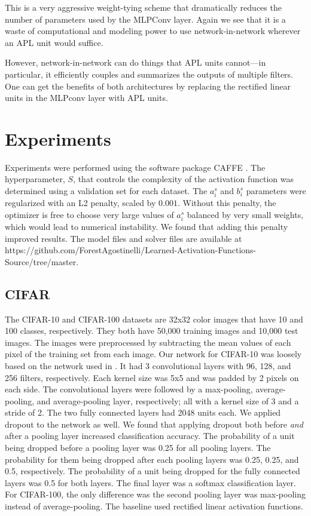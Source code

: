 \documentclass{article} \usepackage{iclr2015,times}
\begin{document}
This is a very aggressive weight-tying scheme that dramatically
reduces the number of parameters used by the MLPConv layer. Again we
see that it is a waste of computational and modeling power to use
network-in-network wherever an APL unit would suffice.



However, network-in-network can do things that APL units cannot---in
particular, it efficiently couples and summarizes the outputs of
multiple filters. One can get the benefits of both architectures by
replacing the rectified linear units in the MLPconv layer with
APL units.

 
\section{Experiments}
\label{sec:experiments}
Experiments were performed using the software package CAFFE \citep{jia2014caffe}. The hyperparameter, $S$, that controls the complexity of the activation function was determined using a validation set for each dataset. The $a^s_i$ and $b^s_i$ parameters were regularized with an L2 penalty, scaled by $0.001$. Without this penalty, the optimizer is free to choose very large values of $a^s_i$ balanced by very small weights, which would lead to numerical instability. We found that adding this penalty improved results. The model files and solver files are available at https://github.com/ForestAgostinelli/Learned-Activation-Functions-Source/tree/master.

\subsection{CIFAR}
The CIFAR-10 and CIFAR-100 datasets \citep{cifar} are 32x32 color images that have 10 and 100 classes, respectively. They both have 50,000 training images and 10,000 test images. The images were preprocessed by subtracting the mean values of each pixel of the training set from each image. Our network for CIFAR-10 was loosely based on the network used in \citep{srivastava2014dropout}. It had 3 convolutional layers with 96, 128, and 256 filters, respectively. Each kernel size was 5x5 and was padded by 2 pixels on each side. The convolutional layers were followed by a max-pooling, average-pooling, and average-pooling layer, respectively; all with a kernel size of 3 and a stride of 2. The two fully connected layers had 2048 units each. We applied dropout \citep{hinton2012improving} to the network as well. We found that applying dropout both before \textit{and} after a pooling layer increased classification accuracy. The probability of a unit being dropped before a pooling layer was 0.25 for all pooling layers. The probability for them being dropped after each pooling layers was 0.25, 0.25, and 0.5, respectively. The probability of a unit being dropped for the fully connected layers was 0.5 for both layers. The final layer was a softmax classification layer. For CIFAR-100, the only difference was the second pooling layer was max-pooling instead of average-pooling. The baseline used rectified linear activation functions.
\end{document}
